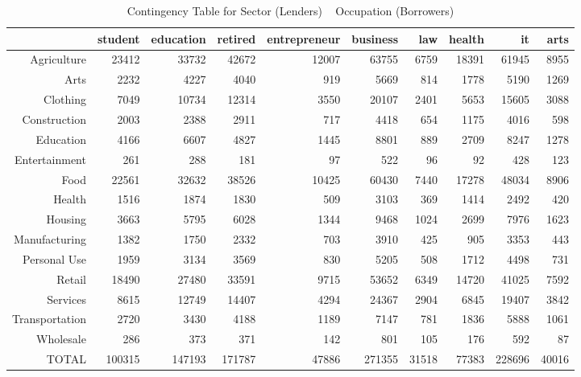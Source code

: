 \begin{table}[!htb]
\centering
\begin{tabular}{rrrrrrrrrr}
  \hline
 & student & education & retired & entrepreneur & business & law & health & it & arts \\ 
  \hline
Agriculture & 23412 & 33732 & 42672 & 12007 & 63755 & 6759 & 18391 & 61945 & 8955 \\ 
  Arts & 2232 & 4227 & 4040 & 919 & 5669 & 814 & 1778 & 5190 & 1269 \\ 
  Clothing & 7049 & 10734 & 12314 & 3550 & 20107 & 2401 & 5653 & 15605 & 3088 \\ 
  Construction & 2003 & 2388 & 2911 & 717 & 4418 & 654 & 1175 & 4016 & 598 \\ 
  Education & 4166 & 6607 & 4827 & 1445 & 8801 & 889 & 2709 & 8247 & 1278 \\ 
  Entertainment & 261 & 288 & 181 & 97 & 522 & 96 & 92 & 428 & 123 \\ 
  Food & 22561 & 32632 & 38526 & 10425 & 60430 & 7440 & 17278 & 48034 & 8906 \\ 
  Health & 1516 & 1874 & 1830 & 509 & 3103 & 369 & 1414 & 2492 & 420 \\ 
  Housing & 3663 & 5795 & 6028 & 1344 & 9468 & 1024 & 2699 & 7976 & 1623 \\ 
  Manufacturing & 1382 & 1750 & 2332 & 703 & 3910 & 425 & 905 & 3353 & 443 \\ 
  Personal Use & 1959 & 3134 & 3569 & 830 & 5205 & 508 & 1712 & 4498 & 731 \\ 
  Retail & 18490 & 27480 & 33591 & 9715 & 53652 & 6349 & 14720 & 41025 & 7592 \\ 
  Services & 8615 & 12749 & 14407 & 4294 & 24367 & 2904 & 6845 & 19407 & 3842 \\ 
  Transportation & 2720 & 3430 & 4188 & 1189 & 7147 & 781 & 1836 & 5888 & 1061 \\ 
  Wholesale & 286 & 373 & 371 & 142 & 801 & 105 & 176 & 592 & 87 \\ 
  TOTAL & 100315 & 147193 & 171787 & 47886 & 271355 & 31518 & 77383 & 228696 & 40016 \\ 
   \hline
\end{tabular}
\caption{Contingency Table for Sector (Lenders) ~ Occupation (Borrowers)} 
\label{tab:contingency_Occ}
\end{table}
